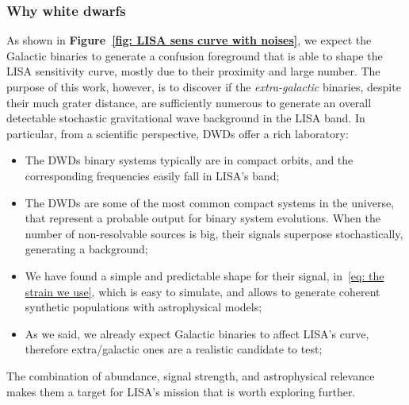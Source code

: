 \subsubsection{Why white dwarfs}
As shown in \textbf{Figure~\ref{fig: LISA sens curve with noises}}, we expect the Galactic binaries to generate a confusion foreground that is able to shape the LISA sensitivity curve, mostly due to their proximity and large number.
The purpose of this work, however, is to discover if the \textit{extra-galactic} binaries, despite their much grater distance, are sufficiently numerous to generate an overall detectable stochastic gravitational wave background in the LISA band.
In particular, from a scientific perspective, DWDs offer a rich laboratory:  
    \begin{itemize}
        \item The DWDs binary systems typically are in compact orbits, and the corresponding frequencies easily fall in LISA's band; 
        \item The DWDs are some of the most common compact systems in the universe, that represent a probable output for binary system evolutions. 
        When the number of non-resolvable sources is big, their signals superpose stochastically, generating a background; 
        \item We have found a simple and predictable shape for their signal, in~\eqref{eq: the strain we use}, which is easy to simulate, and allows to generate coherent synthetic populations with astrophysical models; 
        \item As we said, we already expect Galactic binaries to affect LISA's curve, therefore extra/galactic ones are a realistic candidate to test;
\end{itemize}
The combination of abundance, signal strength, and astrophysical relevance makes them a target for LISA’s mission that is worth exploring further.

